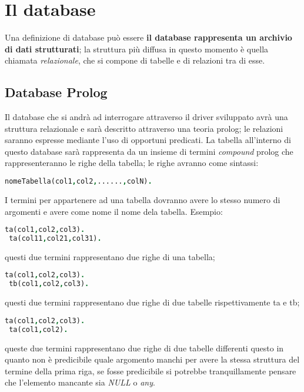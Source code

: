 \section{Il database}

Una definizione di database può essere {\bf il database rappresenta un archivio di dati strutturati}; la struttura più diffusa in questo momento è quella chiamata \emph{relazionale}, che si compone di tabelle e di relazioni tra di esse.

\subsection{Database Prolog}
Il database che si andrà ad interrogare attraverso il driver sviluppato avrà una struttura relazionale e sarà descritto attraverso una teoria prolog; le relazioni saranno espresse mediante l'uso di opportuni predicati. La tabella all'interno di questo database sarà rappresenta da un insieme di termini \emph{compound} prolog che rappresenteranno le righe della tabella; le righe avranno come sintassi:  
\begin{lstlisting}[language=Prolog]
 nomeTabella(col1,col2,......,colN).
\end{lstlisting}
I termini per appartenere ad una tabella dovranno avere lo stesso numero di argomenti e avere come nome il nome dela tabella. Esempio:
\begin{lstlisting}[language=Prolog]
 ta(col1,col2,col3).
 ta(col11,col21,col31).
\end{lstlisting}
questi due termini rappresentano due righe di una tabella;
\begin{lstlisting}[language=Prolog]
 ta(col1,col2,col3).
 tb(col1,col2,col3).
\end{lstlisting}
questi due termini rappresentano due righe di due tabelle rispettivamente ta e tb;
\begin{lstlisting}[language=Prolog]
 ta(col1,col2,col3).
 ta(col1,col2).
\end{lstlisting}
queste due termini rappresentano due righe di due tabelle differenti questo in quanto non è predicibile quale argomento manchi per avere la stessa struttura del termine della prima riga, se fosse predicibile si potrebbe tranquillamente pensare che l'elemento mancante sia \emph{NULL} o \emph{any}.

